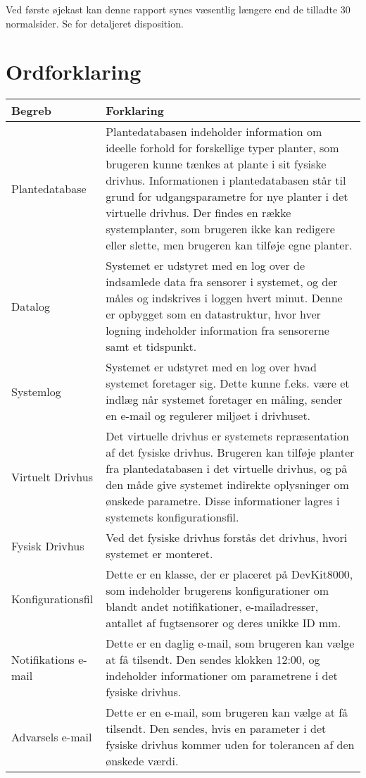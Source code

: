 Ved første øjekast kan denne rapport synes væsentlig længere end de tilladte 30 normalsider. 
Se \cite{lib:dispRapport} for detaljeret disposition. 

\clearpage

\section{Ordforklaring}

\begin{table}[h]
\centering
\begin{tabularx}{/10}{| l | Z |}
\hline
\textbf{Begreb} & \textbf{Forklaring} \\\hline
	Plantedatabase & 
	Plantedatabasen indeholder information om ideelle forhold for forskellige typer planter, som brugeren kunne tænkes at plante i sit fysiske drivhus. Informationen i plantedatabasen står til grund for udgangsparametre for nye planter i det virtuelle drivhus. Der findes en række systemplanter, som brugeren ikke kan redigere eller slette, men brugeren kan tilføje egne planter. \\\hline
	Datalog &
Systemet er udstyret med en log over de indsamlede data fra sensorer i systemet, og der måles og indskrives i loggen hvert minut. Denne er opbygget som en datastruktur, hvor hver logning indeholder information fra sensorerne samt et tidspunkt. \\\hline
	Systemlog &
Systemet er udstyret med en log over hvad systemet foretager sig. Dette kunne f.eks. være et indlæg når systemet foretager en måling, sender en e-mail og regulerer miljøet i drivhuset. \\\hline
	Virtuelt Drivhus &
Det virtuelle drivhus er systemets repræsentation af det fysiske drivhus. Brugeren kan tilføje planter fra plantedatabasen i det virtuelle drivhus, og på den måde give systemet indirekte oplysninger om ønskede parametre. Disse informationer lagres i systemets konfigurationsfil. \\\hline
	Fysisk Drivhus &
Ved det fysiske drivhus forstås det drivhus, hvori systemet er monteret. \\\hline
	Konfigurationsfil &
Dette er en klasse, der er placeret på DevKit8000, som indeholder brugerens konfigurationer om blandt andet notifikationer, e-mailadresser, antallet af fugtsensorer og deres unikke ID mm. \\\hline
	Notifikations e-mail &
Dette er en daglig e-mail, som brugeren kan vælge at få tilsendt. Den sendes klokken 12:00, og indeholder informationer om parametrene i det fysiske drivhus. \\\hline
	Advarsels e-mail &
Dette er en e-mail, som brugeren kan vælge at få tilsendt. Den sendes, hvis en parameter i det fysiske drivhus kommer uden for tolerancen af den ønskede værdi. \\\hline
\end{tabularx}
\end{table}

\clearpage